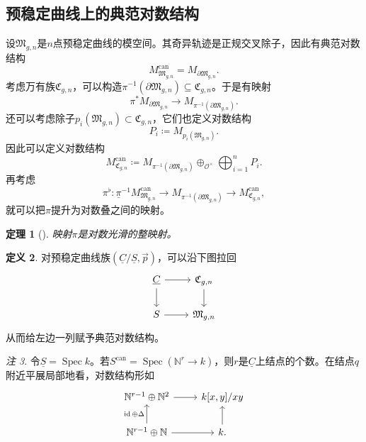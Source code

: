 \documentclass{amsart}
\newtheorem{thm}{定理}[section]
\theoremstyle{definition}
\newtheorem{defn}[thm]{定义}
\theoremstyle{remark}
\newtheorem{rmk}[thm]{注}
\theoremstyle{plain}
\theoremstyle{definition}
\theoremstyle{remark}
\newcommand{\N}{\mathbb{N}}
\newcommand{\mc}[1]{\mathcal{#1}}
\newcommand{\mf}[1]{\mathfrak{#1}}
\newcommand{\on}[1]{\operatorname{#1}}
\newcommand{\ul}[1]{\underline{#1}}
\newcommand{\1}{\mathbf{1}}
\newcommand{\2}{\mathbf{2}}
\newcommand{\3}{\mathbf{3}}
\DeclareMathOperator{\Spec}{Spec}
\begin{document}
\subsection{预稳定曲线上的典范对数结构}%
\label{sub:Canonical log structures on prestable curves}

设\(\mf{M}_{g,n}\)是\(n\)点预稳定曲线的模空间。其奇异轨迹是正规交叉除子，因此有典范对数结构
\[ M_{\mf{M}_{g,n}}^{\on{can}} = M_{\partial \mf{M}_{g,n}}. \]
考虑万有族\(\mf{C}_{g,n}\)，可以构造\(\pi^{-1}(\partial \mf{M}_{g,n}) \subseteq \mf{C}_{g,n}\)。于是有映射
\[ \pi^* M_{\partial \mf{M}_{g,n}} \to M_{\pi^{-1}(\partial \mf{M}_{g,n})}. \]
还可以考虑除子\(p_i(\mf{M}_{g,n}) \subset \mf{C}_{g,n}\)，它们也定义对数结构
\[ P_i \coloneqq M_{p_i(\mf{M}_{g,n})}. \]
因此可以定义对数结构
\[ M_{\mf{C}_{g,n}}^{\on{can}} \coloneqq M_{\pi^{-1}(\partial\mf{M}_{g,n})} \oplus_{\mc{O}^{\times}} \bigoplus_{i=1}^n P_i. \]
再考虑
\[ \pi^{\flat} \colon \ul{\pi}^{-1} M_{\mf{M}_{g,n}}^{\on{can}} \to M_{\pi^{-1}(\partial \mf{M}_{g,n})} \to M_{\mf{C}_{g,n}}^{\on{can}}, \]
就可以把\(\pi\)提升为对数叠之间的映射。

\begin{thm}[{\cite{FKato2000}}]
    映射\(\pi\)是对数光滑的整映射。
\end{thm}

\begin{defn}
    对预稳定曲线族\((\ul{C}/\ul{S}, \vec{p})\)，可以沿下图拉回
    \begin{equation*}
    \begin{tikzcd}
        \ul{C} \ar{r} \ar{d} & \mf{C}_{g,n} \ar{d} \\
        S \ar{r} & \mf{M}_{g,n}
    \end{tikzcd}
    \end{equation*}
    从而给左边一列赋予典范对数结构。
\end{defn}

\begin{rmk}
    令\(\ul{S} = \Spec k\)。若\(S^{\on{can}} = \Spec (\N^r \to k)\)，则\(r\)是\(\ul{C}\)上结点的个数。在结点\(q\)附近平展局部地看，对数结构形如
    \begin{equation*}
    \begin{tikzcd}
        \N^{r-1} \oplus \N^2 \ar{r} & k[x,y]/xy \\
        \N^{r-1} \oplus \N \ar{u}{\on{id}\oplus\Delta} \ar{r} & k \ar{u}.
    \end{tikzcd}
    \end{equation*}
\end{rmk}
\end{document}

